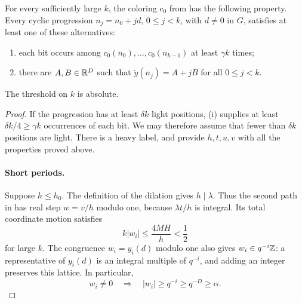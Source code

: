 \begin{theorem}\label{dichotomy:main}
For every sufficiently large $k$, the coloring $c_0$ from
 has the following property. Every cyclic
progression $n_j=n_0+jd$, $0\le j<k$, with $d\ne0$ in $G$,
satisfies at least one of these alternatives:
\begin{enumerate}[label=\textup{(\roman*)}]
 \item each bit occurs among $c_0(n_0),\ldots,c_0(n_{k-1})$
 at least $\gamma k$ times;
 \item there are $A,B\in\mathbb R^D$ such that
 $\tilde y(n_j)=A+jB$ for all $0\le j<k$.
\end{enumerate}
The threshold on $k$ is absolute.
\end{theorem}

\begin{proof}
If the progression has at least $\delta k$ light positions,
\textup{(i)} supplies at least
$\delta k/4\ge\gamma k$ occurrences of each bit. We may therefore
assume that fewer than $\delta k$ positions are light. There is a
heavy label, and 
provide $h,t,u,v$ with all the properties proved above.

\paragraph{Short periods.}
Suppose $h\le h_0$. The definition of the dilation gives
$h\mid\lambda$. Thus the second path in
 has real step $w=v/h$ modulo one,
because $\lambda t/h$ is integral. Its total coordinate motion satisfies
\begin{equation}\label{dichotomy:short-motion}
 k|w_i|\le\frac{4MH}{h}<\frac12
\end{equation}
for large $k$. The congruence $w_i=y_i(d)$ modulo one also gives
$w_i\in q^{-i}\mathbb Z$: a representative of $y_i(d)$ is an integral
multiple of $q^{-i}$, and adding an integer preserves this lattice.
In particular,
\begin{equation}\label{dichotomy:step-lattice}
 w_i\ne0\quad\Longrightarrow\quad
 |w_i|\ge q^{-i}\ge q^{-D}\ge\alpha.
\end{equation}


\end{proof}
